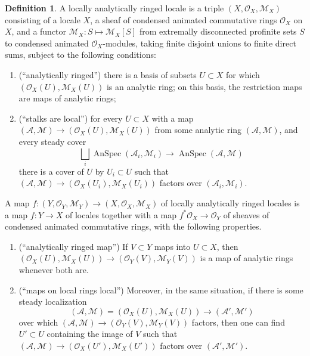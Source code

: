 \documentclass[11pt]{amsbook}
\DeclareMathOperator{\AnSpec}{AnSpec}
\numberwithin{equation}{section}
\numberwithin{theorem}{section}
\theoremstyle{definition}
\newtheorem{definition}[theorem]{Definition}
\begin{document}
\begin{definition} A locally analytically ringed locale is a triple $(X,\mathcal O_X,\mathcal M_X)$ consisting of a locale $X$, a sheaf of condensed animated commutative rings $\mathcal O_X$ on $X$, and a functor $\mathcal M_X: S\mapsto \mathcal M_X[S]$ from extremally disconnected profinite sets $S$ to condensed animated $\mathcal O_X$-modules, taking finite disjoint unions to finite direct sums, subject to the following conditions:
\begin{enumerate}
\item (``analytically ringed'') there is a basis of subsets $U\subset X$ for which $(\mathcal O_X(U),\mathcal M_X(U))$ is an analytic ring; on this basis, the restriction maps are maps of analytic rings;
\item (``stalks are local'') for every $U\subset X$ with a map $(\mathcal A,\mathcal M)\to (\mathcal O_X(U),\mathcal M_X(U))$ from some analytic ring $(\mathcal A,\mathcal M)$, and every steady cover
\[
\bigsqcup_i \AnSpec(\mathcal A_i,\mathcal M_i)\to \AnSpec(\mathcal A,\mathcal M)\,
\]
there is a cover of $U$ by $U_i\subset U$ such that $(\mathcal A,\mathcal M)\to (\mathcal O_X(U_i),\mathcal M_X(U_i))$ factors over $(\mathcal A_i,\mathcal M_i)$.
\end{enumerate}

A map $f: (Y,\mathcal O_Y,\mathcal M_Y)\to (X,\mathcal O_X,\mathcal M_X)$ of locally analytically ringed locales is a map $f: Y\to X$ of locales together with a map $f^\ast\mathcal O_X\to \mathcal O_Y$ of sheaves of condensed animated commutative rings, with the following properties.
\begin{enumerate}
\item (``analytically ringed map'') If $V\subset Y$ maps into $U\subset X$, then $(\mathcal O_X(U),\mathcal M_X(U))\to (\mathcal O_Y(V),\mathcal M_Y(V))$ is a map of analytic rings whenever both are.
\item (``maps on local rings local'') Moreover, in the same situation, if there is some steady localization
\[
(\mathcal A,\mathcal M)=(\mathcal O_X(U),\mathcal M_X(U))\to (\mathcal A',\mathcal M')
\]
over which $(\mathcal A,\mathcal M)\to (\mathcal O_Y(V),\mathcal M_Y(V))$ factors, then one can find $U'\subset U$ containing the image of $V$ such that $(\mathcal A,\mathcal M)\to (\mathcal O_X(U'),\mathcal M_X(U'))$ factors over $(\mathcal A',\mathcal M')$.
\end{enumerate}
\end{definition}
\end{document}
